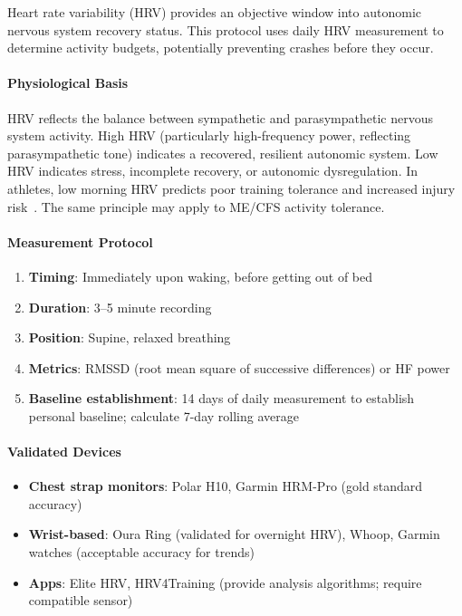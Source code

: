\begin{protocol}
\label{prot:hrv-guided-pacing}
Heart rate variability (HRV) provides an objective window into autonomic nervous system recovery status. This protocol uses daily HRV measurement to determine activity budgets, potentially preventing crashes before they occur.

\paragraph{Physiological Basis}
HRV reflects the balance between sympathetic and parasympathetic nervous system activity. High HRV (particularly high-frequency power, reflecting parasympathetic tone) indicates a recovered, resilient autonomic system. Low HRV indicates stress, incomplete recovery, or autonomic dysregulation. In athletes, low morning HRV predicts poor training tolerance and increased injury risk~\cite{Plews2013hrv}. The same principle may apply to ME/CFS activity tolerance.

\paragraph{Measurement Protocol}
\begin{enumerate}
    \item \textbf{Timing}: Immediately upon waking, before getting out of bed
    \item \textbf{Duration}: 3--5 minute recording
    \item \textbf{Position}: Supine, relaxed breathing
    \item \textbf{Metrics}: RMSSD (root mean square of successive differences) or HF power
    \item \textbf{Baseline establishment}: 14 days of daily measurement to establish personal baseline; calculate 7-day rolling average
\end{enumerate}

\paragraph{Validated Devices}
\begin{itemize}
    \item \textbf{Chest strap monitors}: Polar H10, Garmin HRM-Pro (gold standard accuracy)
    \item \textbf{Wrist-based}: Oura Ring (validated for overnight HRV), Whoop, Garmin watches (acceptable accuracy for trends)
    \item \textbf{Apps}: Elite HRV, HRV4Training (provide analysis algorithms; require compatible sensor)
\end{itemize}


\end{protocol}
